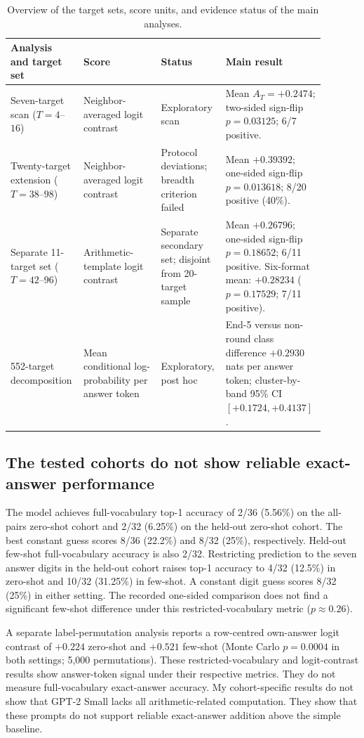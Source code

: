 \documentclass[11pt]{article}
\begin{document}
\begin{table}[t]
\centering
\caption{Overview of the target sets, score units, and evidence status of the main analyses.}
\label{tab:analysis-summary}
\small
\begin{tabular}{p{0.20\linewidth}p{0.24\linewidth}p{0.17\linewidth}p{0.28\linewidth}}
\toprule
Analysis and target set & Score & Status & Main result \\
\midrule
Seven-target scan ($T=4$--$16$) & Neighbor-averaged logit contrast & Exploratory scan & Mean $A_T=+0.2474$; two-sided sign-flip $p=0.03125$; 6/7 positive. \\
Twenty-target extension ($T=38$--$98$) & Neighbor-averaged logit contrast & Protocol deviations; breadth criterion failed & Mean $+0.39392$; one-sided sign-flip $p=0.013618$; 8/20 positive (40\%). \\
Separate 11-target set ($T=42$--$96$) & Arithmetic-template logit contrast & Separate secondary set; disjoint from 20-target sample & Mean $+0.26796$; one-sided sign-flip $p=0.18652$; 6/11 positive. Six-format mean: $+0.28234$ ($p=0.17529$; 7/11 positive). \\
552-target decomposition & Mean conditional log-probability per answer token & Exploratory, post hoc & End-5 versus non-round class difference $+0.2930$ nats per answer token; cluster-by-band 95\% CI $[+0.1724,+0.4137]$. \\
\bottomrule
\end{tabular}
\end{table}

\subsection{The tested cohorts do not show reliable exact-answer performance}

The model achieves full-vocabulary top-1 accuracy of 2/36 (5.56\%) on the all-pairs zero-shot cohort and 2/32 (6.25\%) on the held-out zero-shot cohort. The best constant guess scores 8/36 (22.2\%) and 8/32 (25\%), respectively. Held-out few-shot full-vocabulary accuracy is also 2/32. Restricting prediction to the seven answer digits in the held-out cohort raises top-1 accuracy to 4/32 (12.5\%) in zero-shot and 10/32 (31.25\%) in few-shot. A constant digit guess scores 8/32 (25\%) in either setting. The recorded one-sided comparison does not find a significant few-shot difference under this restricted-vocabulary metric ($p\approx0.26$).

A separate label-permutation analysis reports a row-centred own-answer logit contrast of $+0.224$ zero-shot and $+0.521$ few-shot (Monte Carlo $p=0.0004$ in both settings; 5,000 permutations). These restricted-vocabulary and logit-contrast results show answer-token signal under their respective metrics. They do not measure full-vocabulary exact-answer accuracy. My cohort-specific results do not show that GPT-2 Small lacks all arithmetic-related computation. They show that these prompts do not support reliable exact-answer addition above the simple baseline.
\end{document}

